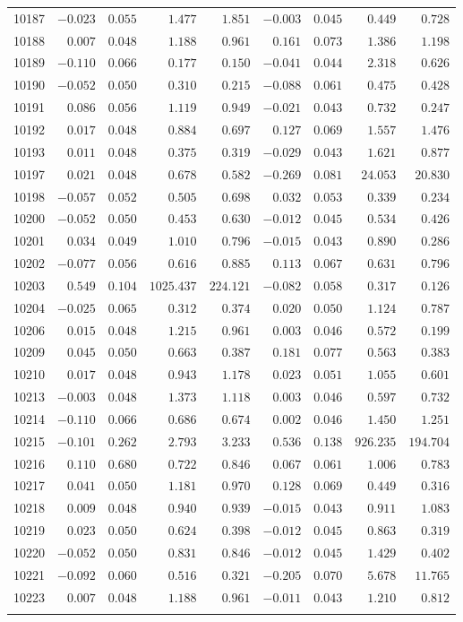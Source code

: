 \documentclass[6pt]{article}
\begin{document}
\begin{landscape}
{\begin{longtable}{lrrrrrrrr}
10187&$-0.023$&$0.055$&$   1.477$&$  1.851$&$-0.003$&$0.045$&$  0.449$&$  0.728$\tabularnewline
10188&$ 0.007$&$0.048$&$   1.188$&$  0.961$&$ 0.161$&$0.073$&$  1.386$&$  1.198$\tabularnewline
10189&$-0.110$&$0.066$&$   0.177$&$  0.150$&$-0.041$&$0.044$&$  2.318$&$  0.626$\tabularnewline
10190&$-0.052$&$0.050$&$   0.310$&$  0.215$&$-0.088$&$0.061$&$  0.475$&$  0.428$\tabularnewline
10191&$ 0.086$&$0.056$&$   1.119$&$  0.949$&$-0.021$&$0.043$&$  0.732$&$  0.247$\tabularnewline
10192&$ 0.017$&$0.048$&$   0.884$&$  0.697$&$ 0.127$&$0.069$&$  1.557$&$  1.476$\tabularnewline
10193&$ 0.011$&$0.048$&$   0.375$&$  0.319$&$-0.029$&$0.043$&$  1.621$&$  0.877$\tabularnewline
10197&$ 0.021$&$0.048$&$   0.678$&$  0.582$&$-0.269$&$0.081$&$ 24.053$&$ 20.830$\tabularnewline
10198&$-0.057$&$0.052$&$   0.505$&$  0.698$&$ 0.032$&$0.053$&$  0.339$&$  0.234$\tabularnewline
10200&$-0.052$&$0.050$&$   0.453$&$  0.630$&$-0.012$&$0.045$&$  0.534$&$  0.426$\tabularnewline
10201&$ 0.034$&$0.049$&$   1.010$&$  0.796$&$-0.015$&$0.043$&$  0.890$&$  0.286$\tabularnewline
10202&$-0.077$&$0.056$&$   0.616$&$  0.885$&$ 0.113$&$0.067$&$  0.631$&$  0.796$\tabularnewline
10203&$ 0.549$&$0.104$&$1025.437$&$224.121$&$-0.082$&$0.058$&$  0.317$&$  0.126$\tabularnewline
10204&$-0.025$&$0.065$&$   0.312$&$  0.374$&$ 0.020$&$0.050$&$  1.124$&$  0.787$\tabularnewline
10206&$ 0.015$&$0.048$&$   1.215$&$  0.961$&$ 0.003$&$0.046$&$  0.572$&$  0.199$\tabularnewline
10209&$ 0.045$&$0.050$&$   0.663$&$  0.387$&$ 0.181$&$0.077$&$  0.563$&$  0.383$\tabularnewline
10210&$ 0.017$&$0.048$&$   0.943$&$  1.178$&$ 0.023$&$0.051$&$  1.055$&$  0.601$\tabularnewline
10213&$-0.003$&$0.048$&$   1.373$&$  1.118$&$ 0.003$&$0.046$&$  0.597$&$  0.732$\tabularnewline
10214&$-0.110$&$0.066$&$   0.686$&$  0.674$&$ 0.002$&$0.046$&$  1.450$&$  1.251$\tabularnewline
10215&$-0.101$&$0.262$&$   2.793$&$  3.233$&$ 0.536$&$0.138$&$926.235$&$194.704$\tabularnewline
10216&$ 0.110$&$0.680$&$   0.722$&$  0.846$&$ 0.067$&$0.061$&$  1.006$&$  0.783$\tabularnewline
10217&$ 0.041$&$0.050$&$   1.181$&$  0.970$&$ 0.128$&$0.069$&$  0.449$&$  0.316$\tabularnewline
10218&$ 0.009$&$0.048$&$   0.940$&$  0.939$&$-0.015$&$0.043$&$  0.911$&$  1.083$\tabularnewline
10219&$ 0.023$&$0.050$&$   0.624$&$  0.398$&$-0.012$&$0.045$&$  0.863$&$  0.319$\tabularnewline
10220&$-0.052$&$0.050$&$   0.831$&$  0.846$&$-0.012$&$0.045$&$  1.429$&$  0.402$\tabularnewline
10221&$-0.092$&$0.060$&$   0.516$&$  0.321$&$-0.205$&$0.070$&$  5.678$&$ 11.765$\tabularnewline
10223&$ 0.007$&$0.048$&$   1.188$&$  0.961$&$-0.011$&$0.043$&$  1.210$&$  0.812$\tabularnewline
\newpage

\end{longtable}}
\end{landscape}
\end{document}
